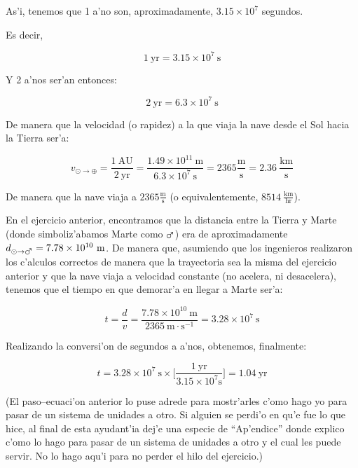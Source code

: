 \documentclass{article}
\begin{document}
\begin{enumerate} [a)]
As'i, tenemos que 1 a'no son, aproximadamente, $3.15 \times 10^7$ segundos.

Es decir, 

\begin{equation*}
1 \ \text{yr} = 3.15 \times 10^7 \ \text{s}
\end{equation*}

Y 2 a'nos ser'an entonces:

\begin{equation*}
2 \ \text{yr} = 6.3 \times 10^7 \ \text{s}
\end{equation*}

De manera que la velocidad (o rapidez) a la que viaja la nave desde el Sol hacia la Tierra ser'a:

\begin{equation*}
v_{\odot \rightarrow \oplus} = \frac{1 \ \text{AU}}{2 \ \text{yr}} = \frac{1.49 \times 10^{11} \ \text{m}}{6.3 \times 10^{7} \ \text{s}} = 2365 \frac{\text{m}}{\text{s}} = 2.36 \ \frac{\text{km}}{\text{s}}
\end{equation*}

De manera que la nave viaja a $2365 \frac{\text{m}}{\text{s}}$ (o equivalentemente, $8514 \ \frac{\text{km}}{\text{hr}}$).

En el ejercicio anterior, encontramos que la distancia entre la Tierra y Marte (donde simboliz'abamos Marte como $\mars$) era de aproximadamente $d_{\odot \rightarrow \mars} = 7.78 \times 10^{10} \ \text{m}$. De manera que, asumiendo que los ingenieros realizaron los c'alculos correctos de manera que la trayectoria sea la misma del ejercicio anterior y que la nave viaja a velocidad constante (no acelera, ni desacelera), tenemos que el tiempo en que demorar'a en llegar a Marte ser'a:

\begin{equation*}
t = \frac{d}{v} = \frac{7.78 \times 10^{10} \ \text{m}}{2365 \ \text{m} \cdot \text{s}^{-1}} = 3.28 \times 10^7 \ \text{s}
\end{equation*} 

Realizando la conversi'on de segundos a a'nos, obtenemos, finalmente:

\begin{equation*}
t = 3.28 \times 10^7 \ \text{s} \times \Big[ \frac{1 \ \text{yr}}{3.15 \times 10^7 \text{s}} \Big] = 1.04 \ \text{yr}
\end{equation*}

(El paso--ecuaci'on anterior lo puse adrede para mostr'arles c'omo hago yo para pasar de un sistema de unidades a otro. Si alguien se perdi'o en qu'e fue lo que hice, al final de esta ayudant'ia dej'e una especie de ``Ap'endice'' donde explico c'omo lo hago para pasar de un sistema de unidades a otro y el cual les puede servir. No lo hago aqu'i para no perder el hilo del ejercicio.)


\end{enumerate}
\end{document}
